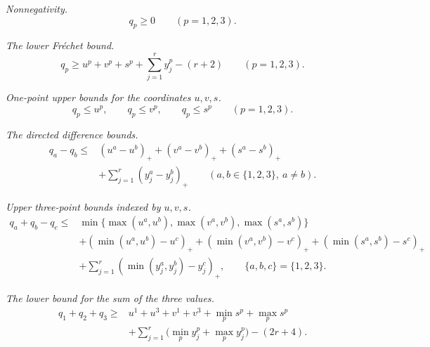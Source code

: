 \documentclass[a4paper,11pt]{amsart}
\numberwithin{equation}{section}
\theoremstyle{definition}
\theoremstyle{remark}
\begin{document}
\noindent \textit{Nonnegativity.}
\begin{equation}
 q_p\ge0
 \qquad(p=1,2,3).
 \tag{H1}\label{eq:H1}
\end{equation}

\noindent \textit{The lower Fr\'echet bound.}
\begin{equation}
 q_p\ge u^p+v^p+s^p+\sum_{j=1}^r y_j^p-(r+2)
 \qquad(p=1,2,3).
 \tag{H2}\label{eq:H2}
\end{equation}

\noindent\textit{One-point upper bounds for the coordinates $u,v,s$.}
\begin{equation}
 q_p\le u^p,\qquad q_p\le v^p,\qquad q_p\le s^p
 \qquad(p=1,2,3).
 \tag{H3}\label{eq:H3}
\end{equation}

\noindent \textit{The directed difference bounds.}
\begin{equation}
\begin{aligned}
 q_a-q_b\le{}&
 (u^a-u^b)_++(v^a-v^b)_++(s^a-s^b)_+\\
 &+\sum_{j=1}^r(y_j^a-y_j^b)_+
 \qquad(a,b\in\{1,2,3\},\ a\ne b).
\end{aligned}
\tag{H4}\label{eq:H4}
\end{equation}


\noindent\textit{Upper three-point bounds indexed by $u,v,s$.}
\begin{equation}
\begin{aligned}
 q_a+q_b-q_c\le{}&
 \min\bigl\{\max(u^a,u^b),\max(v^a,v^b),\max(s^a,s^b)\bigr\}\\
 &+(\min(u^a,u^b)-u^c)_+
  +(\min(v^a,v^b)-v^c)_+
 +(\min(s^a,s^b)-s^c)_+\\
 &+\sum_{j=1}^r(\min(y_j^a,y_j^b)-y_j^c)_+,
 \qquad \{a,b,c\}=\{1,2,3\}.
\end{aligned}
\tag{H5}\label{eq:H5}
\end{equation}


\noindent \textit{The lower bound for the sum of the three values.}
\begin{equation}
\begin{aligned}
 q_1+q_2+q_3\ge{}&u^1+u^3+v^1+v^3+\min_p s^p+\max_p s^p\\
 &+\sum_{j=1}^r\bigl(\min_p y_j^p+\max_p y_j^p\bigr)-(2r+4).
\end{aligned}
\tag{H6}\label{eq:H6}
\end{equation}
\end{document}
